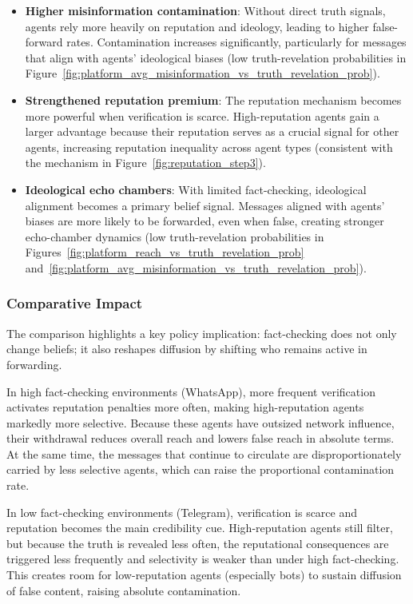 \begin{itemize}
    \item \textbf{Higher misinformation contamination}: Without direct truth signals, agents rely more heavily on reputation and ideology, leading to higher false-forward rates. Contamination increases significantly, particularly for messages that align with agents' ideological biases (low truth-revelation probabilities in Figure~\ref{fig:platform_avg_misinformation_vs_truth_revelation_prob}).
    
    \item \textbf{Strengthened reputation premium}: The reputation mechanism becomes more powerful when verification is scarce. High-reputation agents gain a larger advantage because their reputation serves as a crucial signal for other agents, increasing reputation inequality across agent types (consistent with the mechanism in Figure~\ref{fig:reputation_step3}).
    
    \item \textbf{Ideological echo chambers}: With limited fact-checking, ideological alignment becomes a primary belief signal. Messages aligned with agents' biases are more likely to be forwarded, even when false, creating stronger echo-chamber dynamics (low truth-revelation probabilities in Figures~\ref{fig:platform_reach_vs_truth_revelation_prob} and~\ref{fig:platform_avg_misinformation_vs_truth_revelation_prob}).
\end{itemize}

\subsubsection{Comparative Impact}

The comparison highlights a key policy implication: fact-checking does not only change beliefs; it also reshapes diffusion by shifting who remains active in forwarding.

In high fact-checking environments (WhatsApp), more frequent verification activates reputation penalties more often, making high-reputation agents markedly more selective. Because these agents have outsized network influence, their withdrawal reduces overall reach and lowers false reach in absolute terms. At the same time, the messages that continue to circulate are disproportionately carried by less selective agents, which can raise the proportional contamination rate.

In low fact-checking environments (Telegram), verification is scarce and reputation becomes the main credibility cue. High-reputation agents still filter, but because the truth is revealed less often, the reputational consequences are triggered less frequently and selectivity is weaker than under high fact-checking. This creates room for low-reputation agents (especially bots) to sustain diffusion of false content, raising absolute contamination.

